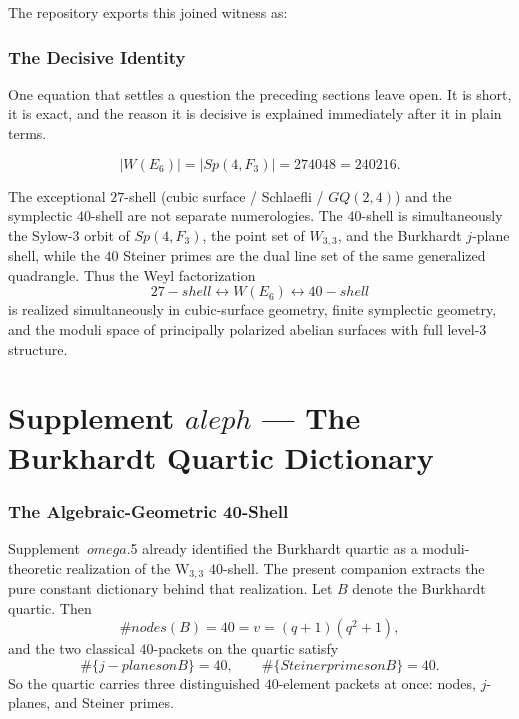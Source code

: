 \documentclass[12pt,a4paper]{article}
\def\mathbb#1{#1}%
\def\mathrm#1{#1}%
\def\mathcal#1{#1}%
\def\text#1{#1}%
\def\omega{omega}%
\def\aleph{aleph}%
\def\cdot{ }%
\theoremstyle{definition}
\newcommand{\GQ}{\mathrm{GQ}}
\newcommand{\Sp}{\mathrm{Sp}}
\newcommand{\FF}{\mathbb{F}}
\begin{document}
The repository exports this joined witness as:
{\small\par\noindent{}\par}


\section*{The Decisive Identity}

\begin{plainbox}
One equation that settles a question the preceding sections leave open. It is short,
it is exact, and the reason it is decisive is explained immediately after it in plain
terms.
\end{plainbox}


\[
\boxed{\;|W(E_6)| = |\Sp(4,\FF_3)| = 27\cdot 40\cdot 48 = 240\cdot 216.\;}
\]

The exceptional $27$-shell (cubic surface / Schlaefli / $\GQ(2,4)$)
and the symplectic $40$-shell are not separate numerologies.  The
$40$-shell is simultaneously the Sylow-$3$ orbit of $\Sp(4,\FF_3)$,
the point set of $W_{3,3}$, and the Burkhardt $j$-plane shell, while
the $40$ Steiner primes are the dual line set of the same generalized
quadrangle.  Thus the Weyl factorization
\[
\boxed{\;27\text{-shell} \longleftrightarrow W(E_6) \longleftrightarrow
40\text{-shell}\;}
\]
is realized simultaneously in cubic-surface geometry, finite symplectic
geometry, and the moduli space of principally polarized abelian surfaces
with full level-$3$ structure.

\clearpage
\part*{\texorpdfstring{Supplement $\aleph$ --- The Burkhardt Quartic Dictionary}{Supplement aleph --- The Burkhardt Quartic Dictionary}}

\section*{The Algebraic-Geometric 40-Shell}

Supplement~$\omega$.5 already identified the Burkhardt quartic as a
moduli-theoretic realization of the W$_{3,3}$ $40$-shell.  The present
companion extracts the pure constant dictionary behind that realization.
Let $\mathcal B$ denote the Burkhardt quartic. Then
\[
\#\mathrm{nodes}(\mathcal B) = 40 = v = (q+1)(q^2+1),
\]
and the two classical $40$-packets on the quartic satisfy
\[
\#\{j\text{-planes on }\mathcal B\} = 40,
\qquad
\#\{\text{Steiner primes on }\mathcal B\} = 40.
\]
So the quartic carries three distinguished $40$-element packets at once:
nodes, $j$-planes, and Steiner primes.
\end{document}
